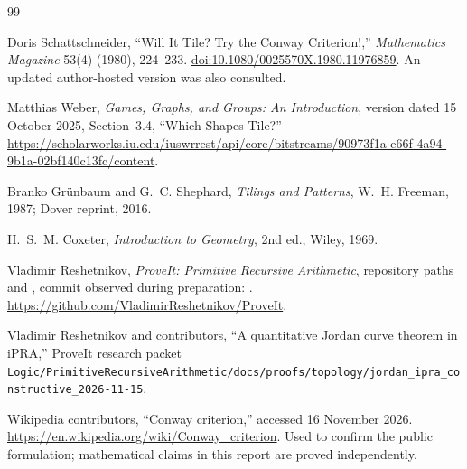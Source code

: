 \begin{thebibliography}{99}

Doris Schattschneider,
``Will It Tile? Try the Conway Criterion!,''
\emph{Mathematics Magazine} 53(4) (1980), 224--233.
\href{https://doi.org/10.1080/0025570X.1980.11976859}{doi:10.1080/0025570X.1980.11976859}.
An updated author-hosted version was also consulted.

Matthias Weber,
\emph{Games, Graphs, and Groups: An Introduction},
version dated 15 October 2025, Section~3.4, ``Which Shapes Tile?''
\url{https://scholarworks.iu.edu/iuswrrest/api/core/bitstreams/90973f1a-e66f-4a94-9b1a-02bf140c13fc/content}.

Branko Gr\"unbaum and G.~C. Shephard,
\emph{Tilings and Patterns},
W.~H. Freeman, 1987; Dover reprint, 2016.

H.~S.~M. Coxeter,
\emph{Introduction to Geometry}, 2nd ed.,
Wiley, 1969.

Vladimir Reshetnikov,
\emph{ProveIt: Primitive Recursive Arithmetic},
repository paths  and
,
commit observed during preparation:
.
\url{https://github.com/VladimirReshetnikov/ProveIt}.

Vladimir Reshetnikov and contributors,
``A quantitative Jordan curve theorem in iPRA,''
ProveIt research packet
\nolinkurl{Logic/PrimitiveRecursiveArithmetic/docs/proofs/topology/jordan_ipra_constructive_2026-11-15}.

Wikipedia contributors,
``Conway criterion,''
accessed 16 November 2026.
\url{https://en.wikipedia.org/wiki/Conway_criterion}.
Used to confirm the public formulation; mathematical claims in this report are proved independently.

\end{thebibliography}
